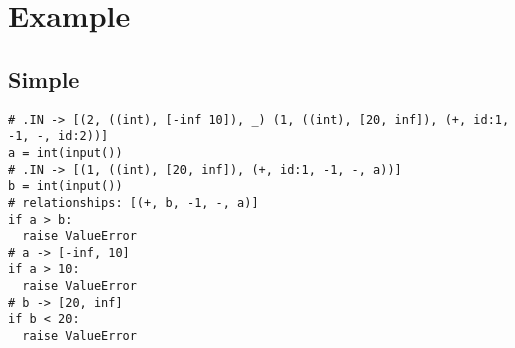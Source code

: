 \documentclass[11pt]{article}
\begin{document}
\section{Example}

\subsection{Simple}

\begin{lstlisting}
# .IN -> [(2, ((int), [-inf 10]), _) (1, ((int), [20, inf]), (+, id:1, -1, -, id:2))]
a = int(input())
# .IN -> [(1, ((int), [20, inf]), (+, id:1, -1, -, a))]
b = int(input())
# relationships: [(+, b, -1, -, a)]
if a > b:
  raise ValueError
# a -> [-inf, 10]
if a > 10:
  raise ValueError
# b -> [20, inf]
if b < 20:
  raise ValueError
\end{lstlisting}
\end{document}
